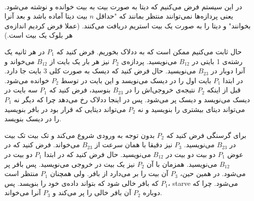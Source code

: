\\\noindent
در این سیستم فرض می‌کنیم که دیتا به صورت بیت به بیت خوانده و نوشته می‌شود. یعنی پردازه‌‌ها نمی‌توانند منتظر
بمانند که
"حداقل $n$ بیت دیتا آماده باشد و بعد آنرا بخوانند"
و دیتا را به صورت یک بیت استریم دریافت می‌کنند.
(عملا فرض کردیم اندازه‌ی هر بلوک یک بیت است.)

\noindent
حال ثابت می‌کنیم ممکن است که به ددلاک بخوریم. فرض کنید که
$P_1$
در هر ثانیه یک رشته‌ی 1 بایتی در
$B_{12}$
می‌نویسید.
پردازه‌ی
$P_2$
نیز هر بار یک بایت از
$B_{12}$
می‌خواند و آنرا دوبار در
$B_{23}$
می‌نویسید. حال فرض کنید که دیسک به صورت کلی 3 بایت جا دارد. در ابتدا
$P_1$
بایت اول را در دیسک می‌نویسد و این بایت در توسط
$P_2$
خوانده می‌شود. قبل از اینکه
$P_2$
نتیجه‌ی خروجی‌اش را در
$B_{23}$
بنوسید، فرض کنید که
$P_1$
سه بایت در دیسک می‌نویسد و دیسک پر می‌شود.
پس در اینجا ددلاک رخ می‌دهد چرا که دیگر نه
$P_1$
می‌تواند دیتای بیشتری را بنویسید و نه
$P_2$
می‌تواند دیتایی که قرار بود در بافر بنویسید را در دیسک بنویسد.

\noindent
برای گرسنگی فرض کنید که
$P_2$
بدون توجه به ورودی شروع می‌کند و تک بیت تک بیت در
$B_{23}$
می‌نویسید.
$P_3$
نیز دقیقا با همان سرعت از
$B_{23}$
می‌خواند. فرض کنید که در عوض
$P_1$
دو بیت دو بیت در
$B_{12}$
می‌نویسید. حال فرض کنید که در ابتدا
$P_1$
دو بیت در
$B_{12}$
می‌نویسید. همزمان با آن
$P_2$
نیز یک بیت در خروجی می‌نویسید. پس بافر پر می‌شود. در همین حین،
$P_3$
آن بیت را بر می‌دارد از بافر. ولی همچنان
$P_1$
منتظر است که بافر خالی شود که بتواند داده‌ی خود را بنویسد. پس
$P_1$، starve
می‌شود. چرا که دوباره
$P_2$
آن بافر خالی را پر می‌کند و
$P_3$
آنرا می‌خواند.